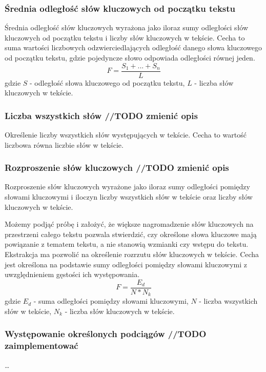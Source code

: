 \documentclass{classrep}
\begin{document}
\subsubsection{Średnia odległość słów kluczowych od początku tekstu}
Średnia odległość słów kluczowych wyrażona jako iloraz sumy odległości słów kluczowych od początku tekstu i liczby
słów kluczowych w tekście. Cecha to suma wartości liczbowych odzwierciedlających odległość danego słowa kluczowego
od początku tekstu, gdzie pojedyncze słowo odpowiada odległości równej jeden.
\begin{equation}
    F=\frac{S_{1} + ... + S_{n}}{L}
\end{equation}
gdzie $S$ - odległość słowa kluczowego od początku tekstu, $L$ -  liczba słów kluczowych w tekście.



\subsubsection{Liczba wszystkich słów //TODO zmienić opis}
Określenie liczby wszystkich słów występujących w tekście. 
Cecha to wartość liczbowa równa liczbie słów w tekście.

\subsubsection{Rozproszenie słów kluczowych //TODO zmienić opis}
Rozproszenie słów kluczowych wyrażone jako iloraz sumy odległości pomiędzy słowami kluczowymi i iloczyn liczby
wszystkich słów w tekście oraz liczby słów kluczowych w tekście.

Możemy podjąć próbę i założyć, że większe nagromadzenie słów kluczowych na przestrzeni całego tekstu pozwala
stwierdzić, czy określone słowa kluczowe mają powiązanie z tematem tekstu, a nie stanowią wzmianki czy wstępu do
tekstu. Ekstrakcja ma pozwolić na określenie rozrzutu słów kluczowych w tekście. Cecha jest określona na podstawie
sumy odległości pomiędzy słowami kluczowymi z uwzględnieniem gęstości ich występowania.
\begin{equation}
    F=\frac{E_{d}}{N*N_{k}}
\end{equation}
gdzie $E_{d}$ - suma odległości pomiędzy słowami kluczowymi, $N$ - liczba wszystkich słów w tekście,
$N_{k}$ - liczba słów kluczowych w tekście.



\subsubsection{Występowanie określonych podciągów //TODO zaimplementować}
\dots
\end{document}

